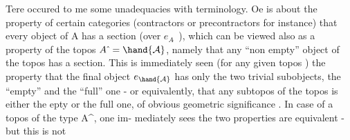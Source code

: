 Tere occured to me some unadequacies with terminology. Oe is
about the property of certain categories (contractors or precontractors
for instance) that every object of A has a section (over $e_{A\hat{\ }}$ ), which
can be viewed also as a property of the topos $A\hat{\ }=\hand{\mathcal{A}}$, namely that any
``non empty'' object of the topos has a section. This is immediately
seen  (for any given topos )  the property that
the final object $e_{\hand{\mathcal{A}}}$ has only the two trivial subobjects, the ``empty''
and the ``full'' one - or equivalently, that any subtopos of the
topos is either the epty or the full one,  of obvious
geometric significance . In case of a topos of the type A\^{}, one im-%
mediately sees the two properties are equivalent - but this is not 


